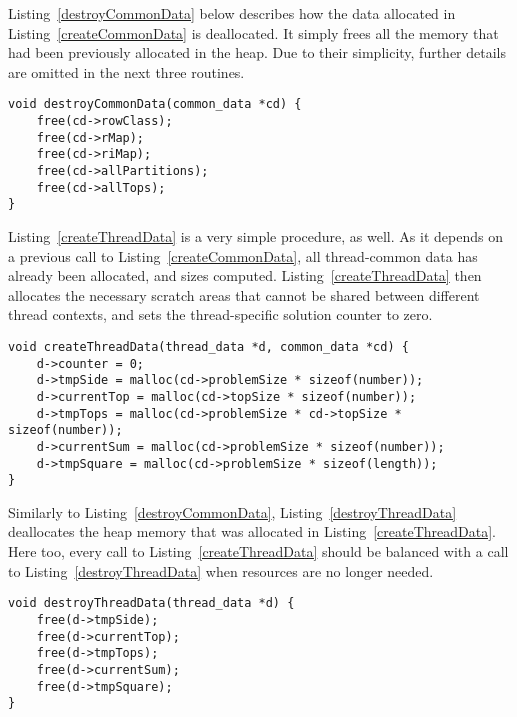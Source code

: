 Listing~\ref{destroyCommonData} below describes how the data allocated in Listing~\ref{createCommonData} is deallocated. It simply frees all the memory that had been previously allocated in the heap. Due to their simplicity, further details are omitted in the next three routines.

\begin{lstlisting}[caption={Deallocating thread-common data.},label={destroyCommonData}]
void destroyCommonData(common_data *cd) {
    free(cd->rowClass);
    free(cd->rMap);
    free(cd->riMap);
    free(cd->allPartitions);
    free(cd->allTops);
}
\end{lstlisting}

Listing~\ref{createThreadData} is a very simple procedure, as well. As it depends on a previous call to Listing~\ref{createCommonData}, all thread-common data has already been allocated, and sizes computed. Listing~\ref{createThreadData} then allocates the necessary scratch areas that cannot be shared between different thread contexts, and sets the thread-specific solution counter to zero.

\begin{lstlisting}[caption={Allocating thread-specific data.},label={createThreadData}]
void createThreadData(thread_data *d, common_data *cd) {
    d->counter = 0;
    d->tmpSide = malloc(cd->problemSize * sizeof(number));
    d->currentTop = malloc(cd->topSize * sizeof(number));
    d->tmpTops = malloc(cd->problemSize * cd->topSize * sizeof(number));
    d->currentSum = malloc(cd->problemSize * sizeof(number));
    d->tmpSquare = malloc(cd->problemSize * sizeof(length));
}
\end{lstlisting}

Similarly to Listing~\ref{destroyCommonData}, Listing~\ref{destroyThreadData} deallocates the heap memory that was allocated in Listing~\ref{createThreadData}. Here too, every call to Listing~\ref{createThreadData} should be balanced with a call to Listing~\ref{destroyThreadData} when resources are no longer needed.

\begin{lstlisting}[caption={Deallocating thread-specific data.},label={destroyThreadData}]
void destroyThreadData(thread_data *d) {
    free(d->tmpSide);
    free(d->currentTop);
    free(d->tmpTops);
    free(d->currentSum);
    free(d->tmpSquare);
}
\end{lstlisting}

